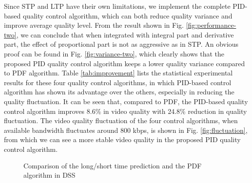 \documentclass[journal]{IEEEtran}
\begin{document}
Since STP and LTP have their own limitations, we implement the complete PID-based quality control algorithm, which can both reduce quality variance and improve average quality level. From the result shown in Fig. \ref{fig:performance-two}, we can conclude that when integrated with integral part and derivative part, the effect of proportional part is not as aggressive as in STP. An obvious proof can be found in Fig. \ref{fig:variance-two}, which clearly shows that the proposed PID quality control algorithm keeps a lower quality variance compared to PDF algorithm. Table \ref{tab:improvement} lists the statistical experimental results for these four quality control algorithms, in which PID-based control algorithm has shown its advantage over the others, especially in reducing the quality fluctuation. It can be seen that, compared to PDF, the PID-based quality control algorithm improves 8.6\% in video quality with 24.8\% reduction in quality fluctuation. The video quality fluctuation of the four control algorithms, when available bandwidth fluctuates around 800 kbps, is shown in Fig. \ref{fig:fluctuation}, from which we can see a more stable video quality in the proposed PID quality control algorithm.

\begin{figure}[t]
\caption{Comparison of the long/short time prediction and the PDF algorithm in DSS}
\label{fig:performance-all}
\end{figure}
\end{document}
